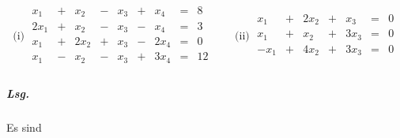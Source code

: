 \documentclass{scrreprt}
\begin{document}
\[
  \text{(i)} \;
  \begin{array}{rcrcrcrcc}
    x_1  & + & x_2  & - & x_3 & + & x_4  & = & 8 \\
    2x_1 & + & x_2  & - & x_3 & - & x_4  & = & 3 \\
    x_1  & + & 2x_2 & + & x_3 & - & 2x_4 & = & 0 \\
    x_1  & - & x_2  & - & x_3 & + & 3x_4 & = & 12 \\
  \end{array}
  \qquad
  \text{(ii)} \;
  \begin{array}{rcrcrcc}
    x_1  & + & 2x_2 & + & x_3  & = & 0 \\
    x_1  & + & x_2  & + & 3x_3 & = & 0 \\
    -x_1 & + & 4x_2 & + & 3x_3 & = & 0 \\
  \end{array}
\]
\subparagraph{Lsg.} Es sind
\end{document}
